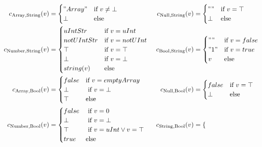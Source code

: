 {\tiny
\begin{align*}
c_{\text{Array},\text{String}}(v) &= \begin{cases}
"Array" & \text{if $v \neq \bot$}\\
\bot & \text{else}
\end{cases} & 
c_{\text{Null},\text{String}}(v) &=\begin{cases} 
       "" & \text{if $v = \top$}\\
       \bot & \text{else}
  \end{cases}\\
c_{\text{Number},\text{String}}(v) &=\begin{cases} 
       uIntStr & \text{if $v = uInt$ }\\
       notUIntStr & \text{if $v = notUInt$  }\\
       \top & \text{if $v = \top$  }\\
       \bot & \text{if $v = \bot$  }\\
       string(v) & \text{else}\\
  \end{cases} &
c_{\text{Bool},\text{String}}(v) &=\begin{cases} 
       "" & \text{if $v = false$}\\
       "1" & \text{if $v = true$}\\
       v & \text{else}
  \end{cases}\\
c_{\text{Array}, \text{Bool}}(v) &= \begin{cases} 
       false & \text{if $v = emptyArray$ }\\
       \bot & \text{ if $v = \bot$}\\
       \top & \text{else}\\
  \end{cases} &
c_{\text{Null}, \text{Bool}}(v) &= \begin{cases} 
       false & \text{if $v = \top$}\\
       \bot & \text{else}
  \end{cases}\\
c_{\text{Number}, \text{Bool}}(v) &=\begin{cases} 
       false & \text{ if $v = 0$} \\
       \bot & \text{ if $v = \bot$}\\
       \top & \text{ if $v = uInt \vee v = \top$}\\
       true & \text{else}
  \end{cases} &
c_{\text{String}, \text{Bool}}(v) &= \begin{cases} 

\end{cases}
\end{align*}}
